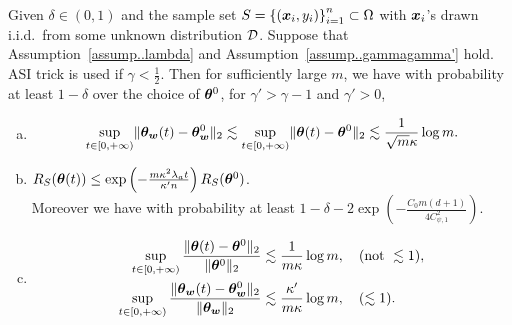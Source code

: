 \documentclass{article}
\begin{document}
\begin{prop}\label{prop..WLazyRegime}
    Given $\delta\in(0,1)$ and the sample set $S = {\{(\bm{x}_i, y_i)\}}_{i=1}^n\subset\Omega$ with $\bm{x}_i$'s drawn i.i.d.\ from some unknown distribution $\mathcal{D}$. Suppose that Assumption~\ref{assump..lambda} and Assumption~\ref{assump..gammagamma'} hold. ASI trick is used if $\gamma<\frac{1}{2}$. Then for sufficiently large $m$, we have with probability at least $1-\delta$ over the choice of $\bm{\theta}^0$, for $\gamma'>\gamma-1$ and $\gamma'>0$,
    \begin{enumerate}[(a)]
        \item \begin{equation}
                  \begin{aligned}
                      \sup\limits_{t\in[0,+\infty)}\lVert\bm{\theta}_{\bm{w}}(t)-\bm{\theta}_{\bm{w}}^0\rVert_2
                        \lesssim \sup\limits_{t\in[0,+\infty)}\lVert\bm{\theta}(t)-\bm{\theta}^0\rVert_2
                       \lesssim\frac{1}{\sqrt{m}\kappa}\log m.
                  \end{aligned}
              \end{equation}
        \item $R_S(\bm{\theta}(t))\leq\exp\left(-\frac{m\kappa^2\lambda_a t}{\kappa'n}\right)R_S(\bm{\theta}^0)$. \\
              Moreover we have with probability at least $1-\delta-2\exp\left(-\frac{C_0m(d+1)}{4C_{\psi,1}^2}\right)$.
        \item \begin{equation}
                  \begin{aligned}
                      \sup\limits_{t\in[0,+\infty)}\frac{\lVert\bm{\theta}(t)-\bm{\theta}^0\rVert_2}{\lVert\bm{\theta}^0\rVert_2}
                       & \lesssim\frac{1}{m\kappa}\log m, \quad (\text{not }\lesssim 1), \\
                      \sup\limits_{t\in[0,+\infty)}\frac{\lVert\bm{\theta}_{\bm{w}}(t)-\bm{\theta}_{\bm{w}}^0\rVert_2}{\lVert\bm{\theta}_{\bm{w}}\rVert_2}
                       & \lesssim\frac{\kappa'}{m\kappa}\log m, \quad (\lesssim 1).
                  \end{aligned}
              \end{equation}
    \end{enumerate}
\end{prop}
\end{document}
